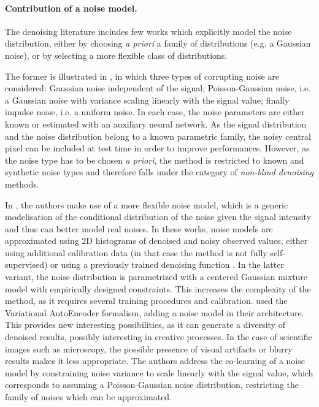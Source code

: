 \documentclass{article}
\begin{document}
\paragraph{Contribution of a noise model.}
The denoising literature includes few works which explicitly model the noise distribution, either by choosing \textit{a priori} a  family of distributions (e.g. a Gaussian noise), or by selecting a more flexible class of distributions.

The former is illustrated in \cite{laine2019high}, in which three types of corrupting noise are considered: Gaussian noise independent of the signal; Poisson-Gaussian noise, i.e. a Gaussian noise with variance scaling linearly with the signal value; finally impulse noise, i.e. a uniform noise. In each case, the noise parameters are either known or estimated with an auxiliary neural network. As the signal distribution and the noise distribution belong to a known parametric family, the noisy central pixel can be included at test time in order to improve performances. However, as the noise type has to be chosen \textit{a priori}, the method is restricted to known and synthetic noise types and therefore falls under the category of \textit{non-blind denoising} methods.

In \cite{krull2019probabilistic,prakash2020fully}, the authors make use of a more flexible noise model, which is a generic modelisation of the conditional distribution of the noise given the signal intensity and thus can better model real noises.
In these works, noise models are approximated using 2D histograms of denoised and noisy observed values, either using additional calibration data (in that case the method is not fully self-supervised) or using a previously trained denoising function \cite{prakash2020fully}.
In the latter variant, the noise distribution is parametrized with a centered Gaussian mixture model with empirically designed constraints.
This increases the complexity of the method, as it requires several training procedures and calibration.
\cite{2020DivNoising} used the Variational Auto\-Encoder formalism, adding a noise model in their architecture.
This provides new interesting possibilities, as it can generate a diversity of denoised results, possibly interesting in creative processes.
In the case of scientific images such as microscopy, the possible presence of visual artifacts or blurry results makes it less appropriate.
The authors address the co-learning of a noise model by constraining noise variance to scale linearly with the signal value, which corresponds to assuming a Poisson-Gaussian noise distribution, restricting the family of noises which can be approximated.
\end{document}
